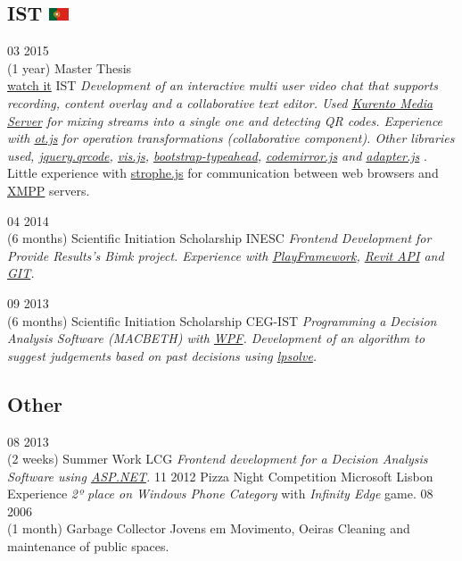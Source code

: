 \documentclass[]{friggeri-cv}
\begin{document}
	\subsection{IST \includegraphics[width=16pt]{pt}}  
		\begin{entrylist}

			\entry
			{03 2015\\(1 year)}
			{Master Thesis \\\href{https://www.youtube.com/watch?v=TWfbcBKbseA}{watch it}}
			{IST}
			{\emph{Development of an interactive multi user video chat that supports recording, content overlay and a collaborative text editor. Used \underline{Kurento Media Server} for mixing streams into a single one and detecting QR codes. Experience with \underline{ot.js} for operation transformations (collaborative component). Other libraries used, \underline{jquery.qrcode}, \underline{vis.js}, \underline{bootstrap-typeahead}, \underline{codemirror.js} and \underline{adapter.js} }. Little experience with \underline{strophe.js} for communication between web browsers and \underline{XMPP} servers. }
			
			\entry
			{04 2014\\(6 months)}
			{Scientific Initiation Scholarship}
			{INESC}
			{\emph{Frontend Development for Provide Results's Bimk project. Experience with \underline{PlayFramework}, \underline{Revit API} and \underline{GIT}.}}
			
			\entry
			{09 2013\\(6 months)}
			{Scientific Initiation Scholarship}
			{CEG-IST}
			{\emph{Programming a Decision Analysis Software (MACBETH) with \underline{WPF}. Development of an algorithm to suggest judgements based on past decisions using \underline{lpsolve}.}}

		\end{entrylist}

\subsection{Other}  
	\begin{entrylist}
		\entry
		{08 2013\\(2 weeks)}
		{Summer Work}
		{LCG}
		{\emph{Frontend development for a Decision Analysis Software using \underline{ASP.NET}. }}
		\entry
		{11 2012}
		{Pizza Night Competition}
		{Microsoft Lisbon Experience}
		{\emph{2º place on Windows Phone Category} with \emph{Infinity Edge} game.}
		\entry
		{08 2006\\(1 month)}
		{Garbage Collector}
		{Jovens em Movimento, Oeiras}
		{Cleaning and maintenance of public spaces.}


		\end{entrylist}
\end{document}
